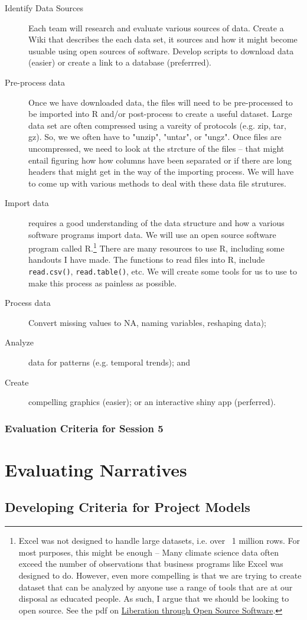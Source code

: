 \documentclass{article}\usepackage[]{graphicx}\usepackage[]{color}
\begin{document}
\begin{description}
  \item[Identify Data Sources] Each team will research and evaluate various sources of data. Create a Wiki that describes the each data set, it sources and how it might become usuable using open sources of software. Develop scripts to download data (easier) or create a link to a database (preferrred). 
  \item[Pre-process data] Once we have downloaded data, the files will need to be pre-processed to be imported into R and/or post-process to create a useful dataset. Large data set are often compressed using a vareity of protocols (e.g. zip, tar, gz). So, we we often have to "unzip", "untar", or "ungz". Once files are uncompressed, we need to look at the strcture of the files -- that might entail figuring how how columns have been separated or if there are long headers that might get in the way of the importing process. We will have to come up with various methods to deal with these data file strutures. 
  \item[Import data] requires a good understanding of the data structure and how a various software programs import data. We will use an open source software program called R.\footnote{Excel was not designed to handle large datasets, i.e. over ~1 million rows. For most purposes, this might be enough -- Many climate science data often exceed the number of observations that business programs like Excel was designed to do. However, even more compelling is that we are trying to create dataset that can be analyzed by anyone use a range of tools that are at our disposal as educated people. As such, I argue that we should be looking to open source. See the pdf on \href{https://rstudio.campus.pomona.edu/s/c2d027b9f6ba35ba4d250/files/github/Climate_Change_Narratives/Data/Liberation_via_Open_Source_Software.pdf}{Liberation through Open Source Software}.} There are many resources to use R, including some handouts I have made. The functions to read files into R, include \texttt{read.csv()}, \texttt{read.table()}, etc. We will create some tools for us to use to make this process as painless as possible. 
  \item[Process data] Convert missing values to NA, naming variables, reshaping data);
  \item[Analyze] data for patterns (e.g. temporal trends); and
  \item[Create] compelling graphics (easier); or an interactive shiny app (perferred).
\end{description}



\subsubsection{Evaluation Criteria for Session 5}


\section{Evaluating Narratives}

\subsection{Developing Criteria for Project Models}
\end{document}
